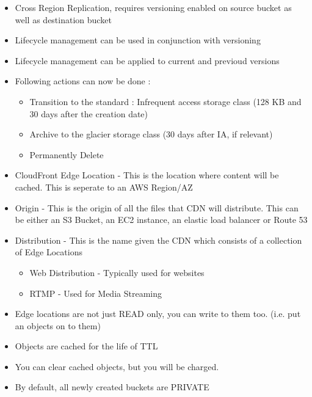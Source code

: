 \documentclass{article}
\begin{document}
\begin{itemize}
\item
Cross Region Replication, requires versioning enabled on source bucket as well as destination bucket

\item
Lifecycle management can be used in conjunction with versioning

\item
Lifecycle management can be applied to current and previoud versions

\item
Following actions can now be done :
	\begin{itemize}
	\item
	Transition to the standard : Infrequent access storage class (128 KB and 30 days after the creation date)
	
	\item
	Archive to the glacier storage class (30 days after IA, if relevant)
	
	\item
	Permanently Delete
	\end{itemize}

\item
CloudFront Edge Location - This is the location where content will be cached. This is seperate to an AWS Region/AZ

\item
Origin - This is the origin of all the files that CDN will distribute. This can be either an S3 Bucket, an EC2 instance, an elastic load balancer or Route 53

\item
Distribution - This is the name given the CDN which consists of a collection of Edge Locations
	\begin{itemize}
	\item
	Web Distribution - Typically used for websites
	
	\item
	RTMP - Used for Media Streaming
	\end{itemize}
	
\item
Edge locations are not just READ only, you can write to them too. (i.e. put an objects on to them)

\item
Objects are cached for the life of TTL

\item
You can clear cached objects, but you will be charged.

\item
By default, all newly created buckets are PRIVATE


\end{itemize}
\end{document}
